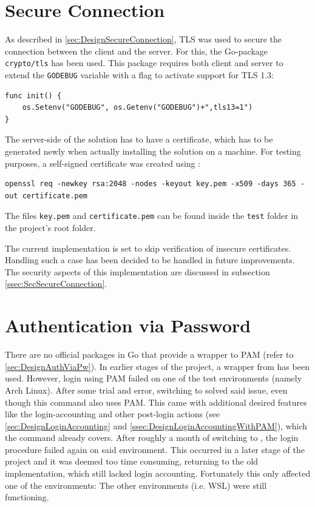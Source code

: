 \documentclass[10pt,a4paper,titlepage,twoside,english,final]{zhawreprt}
\begin{document}
\section{Secure Connection}\label{sec:ImplSecureConnection}
As described in \ref{sec:DesignSecureConnection}, \gls{TLS} was used to secure the connection between the client and the server.
For this, the \gls{Go}-package \texttt{crypto/tls} has been used.
This package requires both client and server to extend the \texttt{GODEBUG} variable with a flag to activate support for \gls{TLS} 1.3:
\setlistingGo
\begin{lstlisting}[caption={Activating \gls{TLS} 1.3 in \gls{Go}},label=lst:TlsInGo]
func init() {
    os.Setenv("GODEBUG", os.Getenv("GODEBUG")+",tls13=1")
}
\end{lstlisting}
The server-side of the solution has to have a certificate, which has to be generated newly when actually installing the solution on a machine.
For testing purposes, a self-signed certificate was created using \cite{openssl}:
\setlistingBash
\begin{lstlisting}[caption={Generating a self-signed certificate and private key},label=lst:GenCertNKey]
openssl req -newkey rsa:2048 -nodes -keyout key.pem -x509 -days 365 -out certificate.pem
\end{lstlisting}
The files \texttt{key.pem} and \texttt{certificate.pem} can be found inside the \texttt{test} folder in the project's root folder.

The current implementation is set to skip verification of insecure certificates.
Handling such a case has been decided to be handled in future improvements.
The security aspects of this implementation are discussed in subsection \ref{ssec:SecSecureConnection}.

\section{Authentication via Password}\label{sec:ImplAuthViaPw}
There are no official packages in \gls{Go} that provide a wrapper to \gls{PAM} (refer to \ref{sec:DesignAuthViaPw}).
In earlier stages of the project, a wrapper from \cite{gopam} has been used.
However, \gls{login} using \gls{PAM} failed on one of the test environments (namely Arch \gls{Linux}).
After some trial and error, switching to \cite{login} solved said issue, even though this command also uses \gls{PAM}.
This came with additional desired features like the \gls{login}-accounting and other post-\gls{login} actions (see \ref{sec:DesignLoginAccounting} and \ref{ssec:DesignLoginAccountingWithPAM}), which the command already covers.
After roughly a month of switching to \cite{login}, the \gls{login} procedure failed again on said environment.
This occurred in a later stage of the project and it was deemed too time consuming, returning to the old implementation, which still lacked \gls{login} accounting.
Fortunately this only affected one of the environments:
The other environments (i.e. \gls{WSL}) were still functioning.
\end{document}
